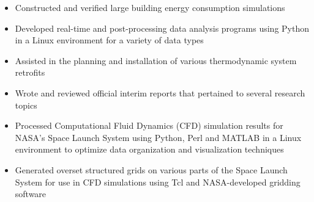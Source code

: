 \documentclass[10pt,ragged2e]{altacv}
\begin{document}
\divider

\begin{itemize}
  \item Constructed and verified large building energy consumption simulations 
\end{itemize}

\begin{itemize}
  \item Developed real-time and post-processing data analysis programs using Python in a Linux environment for a variety of data types
  \item Assisted in the planning and installation of various thermodynamic system retrofits
  \item Wrote and reviewed official interim reports that pertained to several research topics
\end{itemize}

\divider

\begin{itemize}
  \item Processed Computational Fluid Dynamics (CFD) simulation results for NASA's Space Launch System using Python, Perl and MATLAB in a Linux environment to optimize data organization and visualization techniques 
  \item Generated overset structured grids on various parts of the Space Launch System for use in CFD simulations using Tcl and NASA-developed gridding software
\end{itemize}

\clearpage

\nocite{*}
\end{document}
